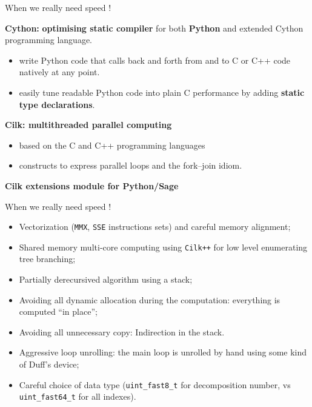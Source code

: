 \documentclass[compress,11pt]{beamer}
\begin{document}
\newcommand{\CilkP}{\texttt{Cilk++}\xspace}
\newcommand{\CPP}{\texttt{C++}\xspace}
\newcommand{\MMX}{\texttt{MMX}\xspace}
\newcommand{\SIMD}{\texttt{SIMD}\xspace}
\newcommand{\SSE}{\texttt{SSE}\xspace}
\newcommand{\SSEV}{\texttt{SSE4.1}\xspace}

\begin{frame}[fragile]{When we really need speed !}

  \textbf{Cython:} \textbf{optimising static compiler} for both
  \textbf{Python} and extended Cython programming language.

\begin{itemize}
\item write Python code that calls back and forth from and to C or C++ code
  natively at any point.
\item easily tune readable Python code into plain C performance by adding
  \textbf{static type declarations}.
\end{itemize}
\bigskip\pause

\textbf{Cilk: multithreaded parallel computing}
\begin{itemize}
\item based on the C and C++ programming languages
\item constructs to express parallel loops and the fork–join idiom.
\end{itemize}
\bigskip\pause

\centering \textbf{\Large\color{red}Cilk extensions module for Python/Sage}
\end{frame}

\begin{frame}[fragile]{When we really need speed !}
\begin{itemize}

\item Vectorization (\MMX, \SSE instructions sets) and careful memory alignment;
\item Shared memory multi-core computing using \CilkP for low level
  enumerating tree branching;
\item Partially derecursived algorithm using a stack;
\item Avoiding all dynamic allocation during the computation: everything is
  computed ``in place'';
\item Avoiding all unnecessary copy: Indirection in the stack.
\item Aggressive loop unrolling: the main loop is unrolled by hand using some
  kind of Duff's device;
\item Careful choice of data type (\verb|uint_fast8_t| for decomposition
  number, vs \verb|uint_fast64_t| for all indexes).
\end{itemize}  
\end{frame}
\end{document}
